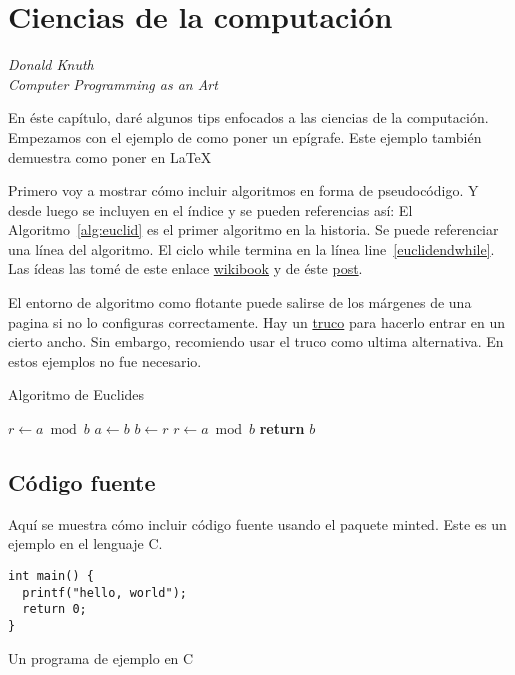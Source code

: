 \chapter{Ciencias de la computación}
\label{chap:cs}

\epigraph{}{\textit{Donald Knuth \\ Computer Programming as an Art}}

En éste capítulo, daré algunos tips enfocados a las ciencias de la computación.
Empezamos con el ejemplo de como poner un epígrafe.
Este ejemplo también demuestra como poner  en \LaTeX{}

Primero voy a mostrar cómo incluir algoritmos en forma de pseudocódigo.
Y desde luego se incluyen en el índice y se pueden referencias así: 
El Algoritmo~\ref{alg:euclid} es el primer algoritmo en la historia.
Se puede referenciar una línea del algoritmo.
El ciclo while termina en la línea line~\ref{euclidendwhile}.
Las ídeas las tomé de este enlace \href{https://en.wikibooks.org/wiki/LaTeX/Algorithms#Typesetting_using_the_algorithmicx_package}{wikibook} y de éste \href{https://tex.stackexchange.com/questions/229355/algorithm-algorithmic-algorithmicx-algorithm2e-algpseudocode-confused}{post}.

El entorno de algoritmo como flotante puede salirse de los márgenes de una pagina si no lo configuras correctamente.
Hay un \href{https://tex.stackexchange.com/questions/350434/adjust-width-of-algorithm-float}{truco} para hacerlo entrar en un cierto ancho.
Sin embargo, recomiendo usar el truco como ultima alternativa.
En estos ejemplos no fue necesario.

\begin{algorithm}[H]
\caption{Algoritmo de Euclides}
\label{alg:euclid}
\begin{algorithmic}[1] %
     
    \State $r\gets a \bmod b$
     
        \State $a \gets b$
        \State $b \gets r$
        \State $r \gets a \bmod b$
    \EndWhile\label{euclidendwhile}
    \State \textbf{return} $b$
    \EndProcedure
\end{algorithmic}
\end{algorithm}


\section{Código fuente}
Aquí se muestra cómo incluir código fuente usando el paquete minted.
Este es un ejemplo en el lenguaje C.
\begin{listing}
\begin{verbatim}
int main() {
  printf("hello, world");
  return 0;
}
\end{verbatim}
\caption{Un programa de ejemplo en C}\label{lst:hello}
\end{listing}

